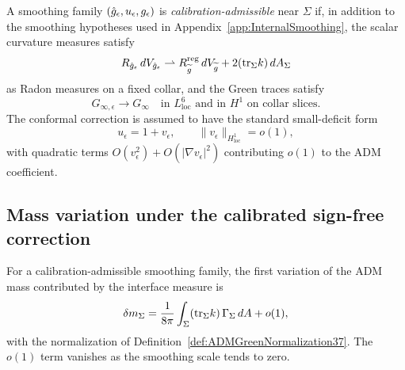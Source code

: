 \begin{definition}\label{def:AdmissibleCalibratedSmoothing37}
A smoothing family \((\hat g_\epsilon,u_\epsilon,g_{\epsilon})\) is \emph{calibration-admissible} near \(\Sigma\) if, in addition to the smoothing hypotheses used in Appendix~\ref{app:InternalSmoothing}, the scalar curvature measures satisfy
\[
    R_{\hat g_\epsilon}\,dV_{\hat g_\epsilon}
    \rightharpoonup
    R_{\widetilde{g}}^{\mathrm{reg}}\,dV_{\widetilde{g}}
    +2(\mathrm{tr}_\Sigma k)\,dA_\Sigma
\]
as Radon measures on a fixed collar, and the Green traces satisfy
\[
    G_{\infty,\epsilon}\to G_\infty
    \quad\text{in }L^6_{\mathrm{loc}}\text{ and in }H^1\text{ on collar slices}.
\]
The conformal correction is assumed to have the standard small-deficit form
\[
    u_\epsilon=1+v_\epsilon,\qquad
    \|v_\epsilon\|_{H^1_{\mathrm{loc}}}=o(1),
\]
with quadratic terms \(O(v_\epsilon^2)+O(|\nabla v_\epsilon|^2)\) contributing \(o(1)\) to the ADM coefficient.
\end{definition}

\subsection{Mass variation under the calibrated sign-free correction}

\begin{lemma}\label{lem:InterfaceADMGreen}
For a calibration-admissible smoothing family, the first variation of the ADM mass contributed by the interface measure is
\begin{equation}\label{eq:ADMGreenPairing37}
    \delta m_\Sigma
    =
    \frac{1}{8\pi}\int_\Sigma (\mathrm{tr}_\Sigma k)\,\Gamma_\Sigma\,dA
    + o(1),
\end{equation}
with the normalization of Definition~\ref{def:ADMGreenNormalization37}. The \(o(1)\) term vanishes as the smoothing scale tends to zero.
\end{lemma}

